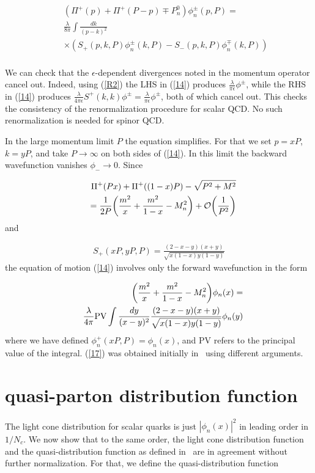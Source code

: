 \documentclass[showpacs,twocolumn,aps,preprintnumbers,letterpaper]{revtex4}
\newcommand{\be}{\begin{equation}}
\newcommand{\ee}{\end{equation}}
\def\be{\begin{eqnarray}}
\def\ee{\end{eqnarray}}
\begin{document}
\be
\label{14}
&&(\Pi^{+}(p)+\Pi^{+}(P-p)\mp P_n^{0})\phi_{n}^{\pm}(p,P)=\nonumber \\ 
&&\frac{\lambda}{8\pi}\int\frac{dk}{(p-k)^2}\nonumber\\
&&\times (S_{+}(p,k,P)\phi_n^{\pm}(k,P)-S_{-}(p,k,P)\phi_n^{\mp}(k,P))\nonumber\\
\ee

We can check that the $\epsilon$-dependent divergences noted in the momentum operator
cancel out. Indeed,  using (\ref{R2}) the LHS in (\ref{14}) produces $\frac{\lambda}{\pi \epsilon} \phi^{\pm}$, while
the RHS in (\ref{14}) produces $\frac{\lambda}{4\pi \epsilon}S^{+}(k,k)\phi^{\pm}=\frac{\lambda}{\pi \epsilon}\phi^{\pm}$,
both of which cancel out. This checks  the consistency of the renormalization procedure for scalar QCD.
No such renormalization is needed for spinor QCD. 

In the large momentum limit $P$ the equation simplifies. For that we set 
$p=xP$,  $k=yP$, and take $P\rightarrow \infty$ on both sides of (\ref{14}).
In this limit the backward wavefunction vanishes $\phi_{-}\rightarrow 0$.
Since

\be
\label{15}
&&\Pi^{+}(Px)+\Pi^{+}((1-x)P)-\sqrt{P^2+M^2}\nonumber \\
&&=\frac{1}{2P}\bigg(\frac{m^2}{x}+\frac{m^2}{1-x}-M_n^2\bigg)+{\cal O}\bigg(\frac{1}{P^2}\bigg)
\ee
and

\be
\label{16}
S_{+}(xP,yP,P)=\frac{(2-x-y)(x+y)}{\sqrt{x(1-x)y(1-y)}}
\ee
the equation of motion (\ref{14}) involves only the forward wavefunction in the form



\be
\label{17}
&&\bigg(\frac{m^2}{x}+\frac{m^2}{1-x}-M_n^2\bigg)\phi_{n}(x)=\nonumber \\ 
&&\frac{\lambda}{4\pi}{\rm PV}\int \frac{dy}{(x-y)^2}\frac{(2-x-y)(x+y)}{\sqrt{x(1-x)y(1-y)}}\phi_n(y)
\ee
where we have defined $\phi_{n}^{+}(xP,P)=\phi_{n}(x)$,
and PV refers to the principal value of the integral. (\ref{17}) was obtained initially 
in~\cite{TAM} using different arguments. 


\section{quasi-parton distribution function}

The light cone distribution for scalar quarks is just 
$|\phi_n(x)|^2$  in leading order in $1/N_c$. We now show that to the same order,
the light cone distribution function and the quasi-distribution function as defined
in~\cite{JI1} are in agreement without further normalization. For that, we define the
quasi-distribution function
\end{document}
